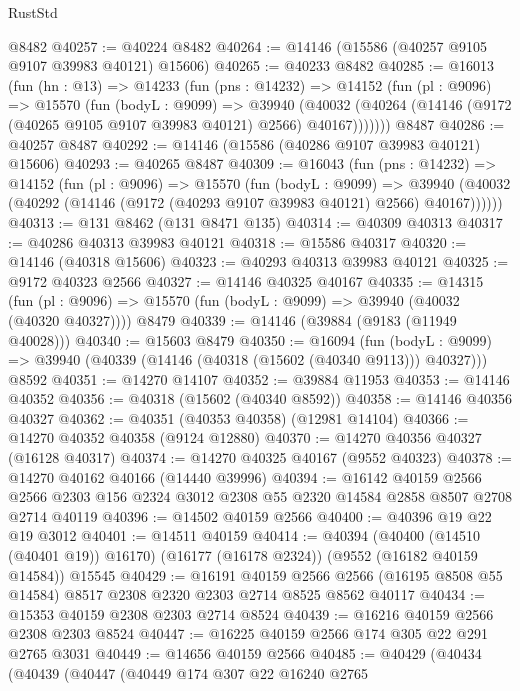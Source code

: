 \begin{lexlean}{RustStd}
\begin{coremodule}
    @8482
@40257 := @40224 @8482
@40264 := @14146 (@15586 (@40257 @9105 @9107 @39983 @40121) @15606)
@40265 := @40233 @8482
@40285 := @16013
    (fun (hn : @13) =>
    @14233
      (fun (pns : @14232) =>
      @14152
        (fun (pl : @9096) =>
        @15570
          (fun (bodyL : @9099) =>
          @39940
            (@40032 (@40264 (@14146 (@9172 (@40265 @9105 @9107 @39983 @40121) @2566) @40167)))))))
    @8487
@40286 := @40257 @8487
@40292 := @14146 (@15586 (@40286 @9107 @39983 @40121) @15606)
@40293 := @40265 @8487
@40309 := @16043
    (fun (pns : @14232) =>
    @14152
      (fun (pl : @9096) =>
      @15570
        (fun (bodyL : @9099) =>
        @39940 (@40032 (@40292 (@14146 (@9172 (@40293 @9107 @39983 @40121) @2566) @40167))))))
@40313 := @131 @8462 (@131 @8471 @135)
@40314 := @40309 @40313
@40317 := @40286 @40313 @39983 @40121
@40318 := @15586 @40317
@40320 := @14146 (@40318 @15606)
@40323 := @40293 @40313 @39983 @40121
@40325 := @9172 @40323 @2566
@40327 := @14146 @40325 @40167
@40335 := @14315
    (fun (pl : @9096) => @15570 (fun (bodyL : @9099) => @39940 (@40032 (@40320 @40327))))
    @8479
@40339 := @14146 (@39884 (@9183 (@11949 @40028)))
@40340 := @15603 @8479
@40350 := @16094
    (fun (bodyL : @9099) => @39940 (@40339 (@14146 (@40318 (@15602 (@40340 @9113))) @40327)))
    @8592
@40351 := @14270 @14107
@40352 := @39884 @11953
@40353 := @14146 @40352
@40356 := @40318 (@15602 (@40340 @8592))
@40358 := @14146 @40356 @40327
@40362 := @40351 (@40353 @40358) (@12981 @14104)
@40366 := @14270 @40352 @40358 (@9124 @12880)
@40370 := @14270 @40356 @40327 (@16128 @40317)
@40374 := @14270 @40325 @40167 (@9552 @40323)
@40378 := @14270 @40162 @40166 (@14440 @39996)
@40394 := @16142
    @40159
    @2566
    @2566
    @2303
    @156
    @2324
    @3012
    @2308
    @55
    @2320
    @14584
    @2858
    @8507
    @2708
    @2714
    @40119
@40396 := @14502 @40159 @2566
@40400 := @40396 @19 @22 @19 @3012
@40401 := @14511 @40159
@40414 := @40394
    (@40400 (@14510 (@40401 @19)) @16170)
    (@16177 (@16178 @2324))
    (@9552 (@16182 @40159 @14584))
    @15545
@40429 := @16191
    @40159
    @2566
    @2566
    (@16195 @8508 @55 @14584)
    @8517
    @2308
    @2320
    @2303
    @2714
    @8525
    @8562
    @40117
@40434 := @15353 @40159 @2308 @2303 @2714 @8524
@40439 := @16216 @40159 @2566 @2308 @2303 @8524
@40447 := @16225 @40159 @2566 @174 @305 @22 @291 @2765 @3031
@40449 := @14656 @40159 @2566
@40485 := @40429
    (@40434
      (@40439
        (@40447
          (@40449
            @174
            @307
            @22
            @16240
            @2765

\end{coremodule}
\end{lexlean}
